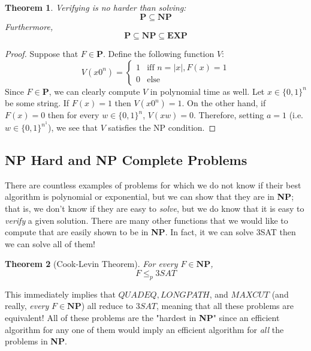 \documentclass[a4paper, 12pt]{report}
\newtheorem{theorem}{Theorem}[section]
\theoremstyle{remark}
\theoremstyle{definition}
\begin{document}
\begin{theorem}
Verifying is no harder than solving: 
\[\mathbf{P} \subseteq \mathbf{NP}\]
Furthermore, 
\[\mathbf{P} \subseteq \mathbf{NP} \subseteq \mathbf{EXP}\]
\begin{center}
\end{center}
\end{theorem}
\begin{proof}
Suppose that $F \in \mathbf{P}$. Define the following function $V$:
\[V (x 0^n) = \begin{cases}
1 & \text{iff } n = |x|, F(x) = 1 \\
0 & \text{else} 
\end{cases}\]
Since $F \in \mathbf{P}$, we can clearly compute $V$ in polynomial time as well. Let $x \in \{0,1\}^n$ be some string. If $F(x) = 1$ then $V(x 0^n) = 1$. On the other hand, if $F(x) = 0$ then for every $w \in \{0,1\}^n$, $V(xw) = 0$. Therefore, setting $a = 1$ (i.e. $w \in \{0,1\}^{n^1}$), we see that $V$ satisfies the NP condition. 
\end{proof}

\subsection{NP Hard and NP Complete Problems}
There are countless examples of problems for which we do not know if their best algorithm is polynomial or exponential, but we can show that they are in \textbf{NP}; that is, we don't know if they are easy to \textit{solve}, but we do know that it is easy to \textit{verify} a given solution. There are many other functions that we would like to compute that are easily shown to be in \textbf{NP}. In fact, it we can solve 3SAT then we can solve all of them! 

\begin{theorem}[Cook-Levin Theorem]
For every $F \in \mathbf{NP}$, 
\[F \leq_p 3SAT\]
\end{theorem}
This immediately implies that $QUADEQ, LONGPATH$, and $MAXCUT$ (and really, \textit{every} $F \in \mathbf{NP}$) all reduce to $3SAT$, meaning that all these problems are equivalent! All of these problems are the "hardest in \textbf{NP}" since an efficient algorithm for any one of them would imply an efficient algorithm for \textit{all} the problems in \textbf{NP}. 
\end{document}
